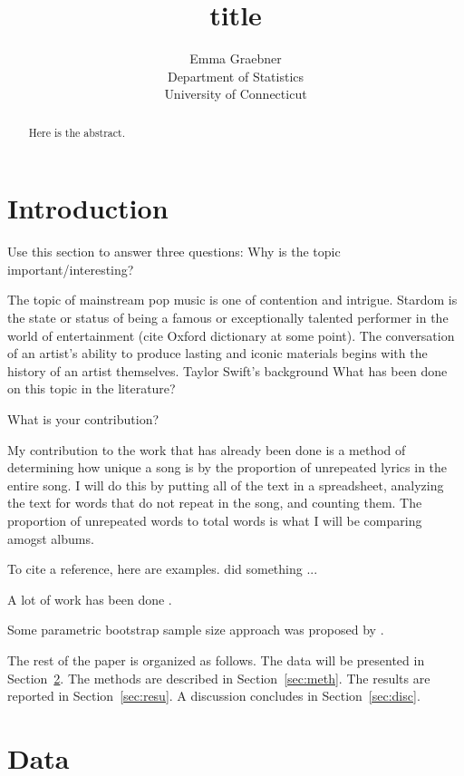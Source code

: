\documentclass[12pt]{article}
\title{title}
\author{Emma Graebner\\
  Department of Statistics\\
  University of Connecticut
}
\begin{document}
\maketitle

\begin{abstract}
Here is the abstract.  
\end{abstract}


\section{Introduction}
\label{sec:intro}

Use this section to answer three questions:
Why is the topic important/interesting?

  The topic of mainstream pop music is one of contention and intrigue. Stardom is the state or status of being a famous or exceptionally talented performer in the world of entertainment (cite Oxford dictionary at some point). The conversation of an artist's ability to produce lasting and iconic materials begins with the history of an artist themselves. Taylor Swift's background 
What has been done on this topic in the literature?

What is your contribution?

My contribution to the work that has already been done is a method of determining how unique a song is by the proportion of unrepeated lyrics in the entire song. I will do this by putting all of the text in a spreadsheet, analyzing the text for words that do not repeat in the song, and counting them. The proportion of unrepeated words to total words is what I will be comparing amogst albums.  



To cite a reference, here are examples.
\citet{xie2015dynamic} did something ... 

A lot of work has been done \citep[e.g.,][]{xie2015dynamic}.

Some parametric bootstrap sample size approach was proposed by
\citet{dwivedi2017analysis}. 


The rest of the paper is organized as follows.
The data will be presented in Section~\ref{sec:data}.
The methods are described in Section~\ref{sec:meth}.
The results are reported in Section~\ref{sec:resu}.
A discussion concludes in Section~\ref{sec:disc}.


\section{Data}
\label{sec:data}
\end{document}
